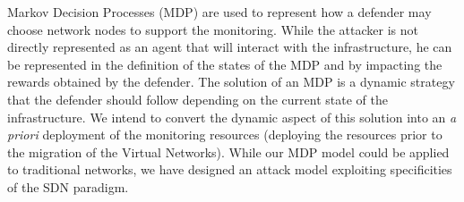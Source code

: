 Markov Decision Processes (MDP) are used to represent how a defender may choose network nodes to support the monitoring.
While the attacker is not directly represented as an agent that will interact with the infrastructure, he can be represented in the definition of the states of the MDP and by impacting the rewards obtained by the defender.
The solution of an MDP is a dynamic strategy that the defender should follow depending on the current state of the infrastructure.
We intend to convert the dynamic aspect of this solution into an \textit{a priori} deployment of the monitoring resources (\ie deploying the resources prior to the migration of the Virtual Networks).
While our MDP model could be applied to traditional networks, we have designed an attack model exploiting specificities of the SDN paradigm.